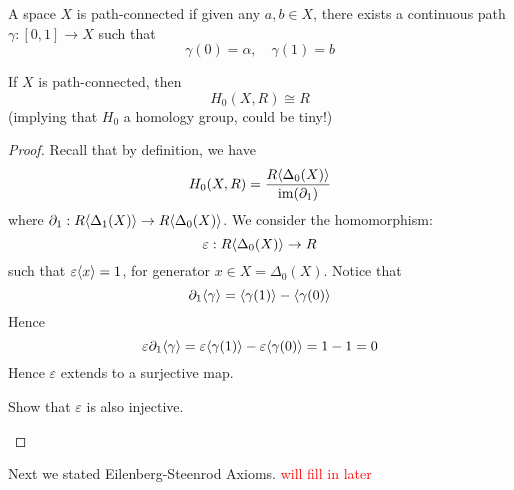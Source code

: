 \begin{defn}
    A space $X$ is path-connected if given any $a,b\in X$, there exists a continuous path $\gamma:[0,1]\to X$ such that 
    \begin{equation*}
        \gamma(0)=\alpha, \quad \gamma(1)=b
    \end{equation*}
\end{defn}
\begin{prop}
    If $X$ is path-connected, then 
    \begin{equation*}
        H_0(X,R)\cong R
    \end{equation*}
    (implying that $H_0$ a homology group, could be tiny!)
\end{prop}
\begin{proof}
    Recall that by definition, we have 
    \begin{equation*}
        H_0(X,R)=\frac{R\langle\Delta_0(X)\rangle}{\operatorname{im}(\partial_1)}
    \end{equation*}
    where $\partial_1:R\langle\Delta_1(X)\rangle\to R\langle\Delta_0(X)\rangle$. We consider the homomorphism: 
    \begin{equation*}
        \varepsilon: R\langle\Delta_0(X)\rangle\to R
    \end{equation*}
    such that $\varepsilon\langle x\rangle=1$, for generator $x\in X=\Delta_0(X)$. Notice that 
    \begin{equation*}
        \partial_1\langle\gamma\rangle=\langle\gamma(1)\rangle-\langle\gamma(0)\rangle
    \end{equation*}
    Hence 
    \begin{equation*}
        \varepsilon\partial_1\langle\gamma\rangle=\varepsilon\langle \gamma(1)\rangle-\varepsilon\langle \gamma(0)\rangle=1-1=0
    \end{equation*}
    Hence $\varepsilon$ extends to a surjective map. 
    \begin{prob}[HW(2.8)]
        Show that $\varepsilon$ is also injective.
    \end{prob}
\end{proof}

Next we stated Eilenberg-Steenrod Axioms.
\textcolor{red}{will fill in later}

